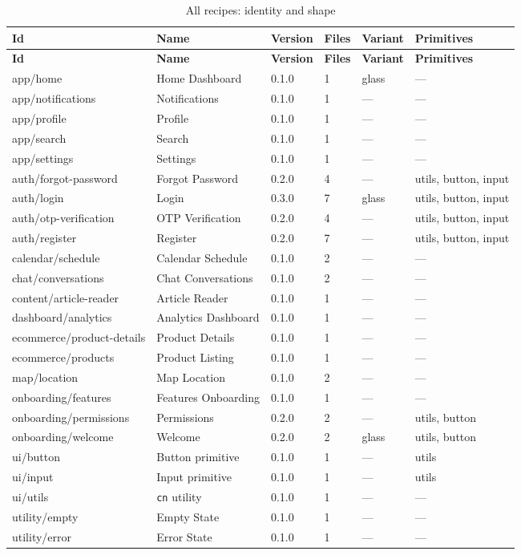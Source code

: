 \begin{longtable}{@{}L{3.6cm}L{5.4cm}L{1.5cm}L{1.1cm}L{1.5cm}L{2.1cm}@{}}
\caption{All recipes: identity and shape}\\
\toprule
\textbf{Id} & \textbf{Name} & \textbf{Version} & \textbf{Files} & \textbf{Variant} &
\textbf{Primitives} \\
\midrule
\endfirsthead
\toprule
\textbf{Id} & \textbf{Name} & \textbf{Version} & \textbf{Files} & \textbf{Variant} &
\textbf{Primitives} \\
\midrule
\endhead
app/home & Home Dashboard & 0.1.0 & 1 & glass & --- \\
app/notifications & Notifications & 0.1.0 & 1 & --- & --- \\
app/profile & Profile & 0.1.0 & 1 & --- & --- \\
app/search & Search & 0.1.0 & 1 & --- & --- \\
app/settings & Settings & 0.1.0 & 1 & --- & --- \\
auth/forgot-password & Forgot Password & 0.2.0 & 4 & --- & utils, button, input \\
auth/login & Login & 0.3.0 & 7 & glass & utils, button, input \\
auth/otp-verification & OTP Verification & 0.2.0 & 4 & --- & utils, button, input \\
auth/register & Register & 0.2.0 & 7 & --- & utils, button, input \\
calendar/schedule & Calendar Schedule & 0.1.0 & 2 & --- & --- \\
chat/conversations & Chat Conversations & 0.1.0 & 2 & --- & --- \\
content/article-reader & Article Reader & 0.1.0 & 1 & --- & --- \\
dashboard/analytics & Analytics Dashboard & 0.1.0 & 1 & --- & --- \\
ecommerce/product-details & Product Details & 0.1.0 & 1 & --- & --- \\
ecommerce/products & Product Listing & 0.1.0 & 1 & --- & --- \\
map/location & Map Location & 0.1.0 & 2 & --- & --- \\
onboarding/features & Features Onboarding & 0.1.0 & 1 & --- & --- \\
onboarding/permissions & Permissions & 0.2.0 & 2 & --- & utils, button \\
onboarding/welcome & Welcome & 0.2.0 & 2 & glass & utils, button \\
ui/button & Button primitive & 0.1.0 & 1 & --- & utils \\
ui/input & Input primitive & 0.1.0 & 1 & --- & utils \\
ui/utils & \texttt{cn} utility & 0.1.0 & 1 & --- & --- \\
utility/empty & Empty State & 0.1.0 & 1 & --- & --- \\
utility/error & Error State & 0.1.0 & 1 & --- & --- \\
\bottomrule
\end{longtable}

